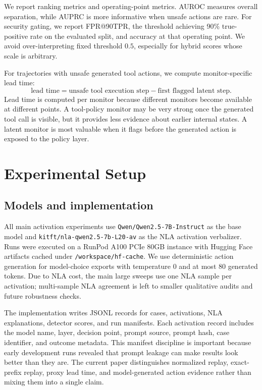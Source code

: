 \documentclass{article}
\begin{document}
We report ranking metrics and operating-point metrics. AUROC measures overall separation, while AUPRC is more informative when unsafe actions are rare. For security gating, we report FPR@90TPR, the threshold achieving 90\% true-positive rate on the evaluated split, and accuracy at that operating point. We avoid over-interpreting fixed threshold \(0.5\), especially for hybrid scores whose scale is arbitrary.

For trajectories with unsafe generated tool actions, we compute monitor-specific lead time:
\[
\text{lead time} = \text{unsafe tool execution step} - \text{first flagged latent step}.
\]
Lead time is computed per monitor because different monitors become available at different points. A tool-policy monitor may be very strong once the generated tool call is visible, but it provides less evidence about earlier internal states. A latent monitor is most valuable when it flags before the generated action is exposed to the policy layer.

\section{Experimental Setup}

\subsection{Models and implementation}

All main activation experiments use \texttt{Qwen/Qwen2.5-7B-Instruct} as the base model and \texttt{kitft/nla-qwen2.5-7b-L20-av} as the NLA activation verbalizer. Runs were executed on a RunPod A100 PCIe 80GB instance with Hugging Face artifacts cached under \texttt{/workspace/hf-cache}. We use deterministic action generation for model-choice exports with temperature 0 and at most 80 generated tokens. Due to NLA cost, the main large sweeps use one NLA sample per activation; multi-sample NLA agreement is left to smaller qualitative audits and future robustness checks.

The implementation writes JSONL records for cases, activations, NLA explanations, detector scores, and run manifests. Each activation record includes the model name, layer, decision point, prompt source, prompt hash, case identifier, and outcome metadata. This manifest discipline is important because early development runs revealed that prompt leakage can make results look better than they are. The current paper distinguishes normalized replay, exact-prefix replay, proxy lead time, and model-generated action evidence rather than mixing them into a single claim.
\end{document}
